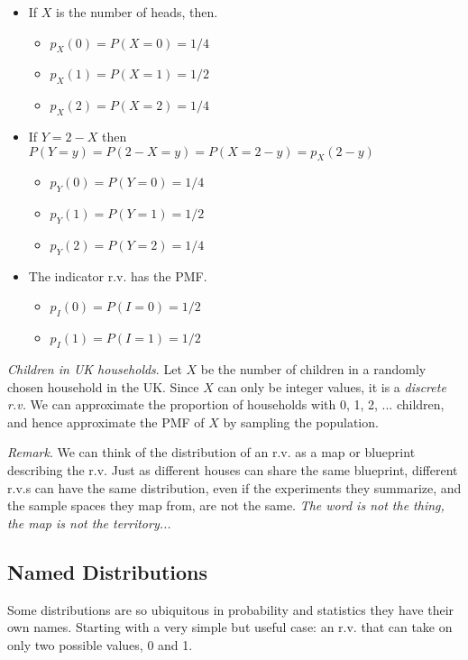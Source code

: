 \documentclass[11pt,a4paper]{article}
\begin{document}
\begin{itemize}
\item
  If \(X\) is the number of heads, then.
  \begin{itemize}
  \item
    \(p_{X}(0) = P(X = 0) = 1/4\)
  \item
    \(p_{X}(1) = P(X = 1) = 1/2\)
  \item
    \(p_{X}(2) = P(X = 2) = 1/4\)
  \end{itemize}
\item
  If \(Y = 2 - X\) then
  \(P(Y = y) = P(2 - X = y) = P(X = 2 - y) = p_{X}(2 - y)\)
  \begin{itemize}
  \item
    \(p_{Y}(0) = P(Y = 0) = 1/4\)
  \item
    \(p_{Y}(1) = P(Y = 1) = 1/2\)
  \item
    \(p_{Y}(2) = P(Y = 2) = 1/4\)
  \end{itemize}
\item
  The indicator r.v. has the PMF.
  \begin{itemize}
  \item
    \(p_{I}(0) = P(I = 0) = 1/2\)
  \item
    \(p_{I}(1) = P(I = 1) = 1/2\)
  \end{itemize}
\end{itemize}

\emph{Children in UK households}. 
Let \(X\) be the number of children in 
a randomly chosen household in the UK. 
Since \(X\) can only be integer values, 
it is a \emph{discrete r.v.} 
We can approximate the proportion
of households with 0, 1, 2, ... children, 
and hence approximate the PMF of \(X\) by sampling the population.

\emph{Remark}. 
We can think of the distribution of an r.v. as
a map or blueprint describing the r.v. 
Just as different houses can share the same blueprint, 
different r.v.s can have the same distribution, 
even if the experiments they summarize, 
and the sample spaces they map from, 
are not the same. 
\emph{The word is not the thing,
the map is not the territory...}

\subsection{Named Distributions}

Some distributions are so ubiquitous in probability and statistics they 
have their own names. 
Starting with a very simple but useful case: 
an r.v. that can take on only two possible values, 0 and 1.
\end{document}
